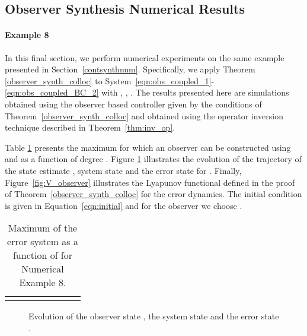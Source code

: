 \documentclass[9pt,journal,twocolumn]{IEEEtran}
\begin{document}
\subsection{Observer Synthesis Numerical Results}

\paragraph{Example 8} In this final section, we perform numerical experiments on the same example presented in Section~\ref{contsynthnum}. Specifically, we apply Theorem \ref{observer_synth_colloc} to System~\eqref{eqn:obs_coupled_1}-\eqref{eqn:obs_coupled_BC_2} with , , . The results presented here are simulations obtained using the observer based controller  given by the conditions of Theorem~\ref{observer_synth_colloc} and obtained using the operator inversion technique described in Theorem~\ref{thm:inv_op}.

Table \ref{table_obs_2} presents the maximum   for which an observer can be constructed using  and  as a function of degree . Figure \ref{fig:obs} illustrates the evolution of the trajectory of the state estimate , system state  and the error state  for . Finally, Figure~\ref{fig:V_observer} illustrates the Lyapunov functional defined in the proof of Theorem~\ref{observer_synth_colloc} for the error dynamics. The initial condition  is given in Equation~\eqref{eqn:initial} and for the observer we choose .


\begin{table}[h!]
\begin{center}
    \begin{tabular}{l *{7}{c}}\hline \hline
  &  &  &  &  \\ \hline
 &   &  &  &  \\
\end{tabular}
\end{center}
\caption{Maximum  of the error system as a function of  for Numerical Example 8.}
\label{table_obs_2}
\end{table}



\begin{figure}[ht]
\centering
{}
\quad
{}
\quad
{}
\caption{Evolution of the observer state , the system state  and the error state .}
\label{fig:obs}
\end{figure}
\end{document}

